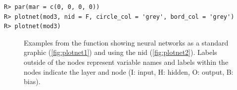 \documentclass[article,shortnames]{jss}\usepackage[]{graphicx}\usepackage[]{color}
\makeatletter
\newenvironment{kframe}{%
 \def\at@end@of@kframe{}%
 \ifinner\ifhmode%
  \def\at@end@of@kframe{\end{minipage}}%
  \begin{minipage}{\columnwidth}%
 \fi\fi%
 \def\FrameCommand##1{\hskip\@totalleftmargin \hskip-\fboxsep
 \colorbox{shadecolor}{##1}\hskip-\fboxsep
     \hskip-\linewidth \hskip-\@totalleftmargin \hskip\columnwidth}%
 \MakeFramed {\advance\hsize-\width
   \@totalleftmargin\z@ \linewidth\hsize
   \@setminipage}}%
 {\par\unskip\endMakeFramed%
 \at@end@of@kframe}
\newenvironment{knitrout}{}{} %
\makeatother
\begin{document}
\begin{knitrout}
\color{fgcolor}\begin{kframe}
\begin{verbatim}
R> par(mar = c(0, 0, 0, 0))
R> plotnet(mod3, nid = F, circle_col = 'grey', bord_col = 'grey')
R> plotnet(mod3)
\end{verbatim}
\end{kframe}\begin{figure}[!ht]

{\centering {}

}

\caption{Examples from the  function showing neural networks as a standard graphic (\ref{fig:plotnet1}) and using the \acl{nid} (\ref{fig:plotnet2}).  Labels outside of the nodes represent variable names and labels within the nodes indicate the layer and node (I: input, H: hidden, O: output, B: bias).}\label{fig:plotnet}
\end{figure}


\end{knitrout}
\end{document}
